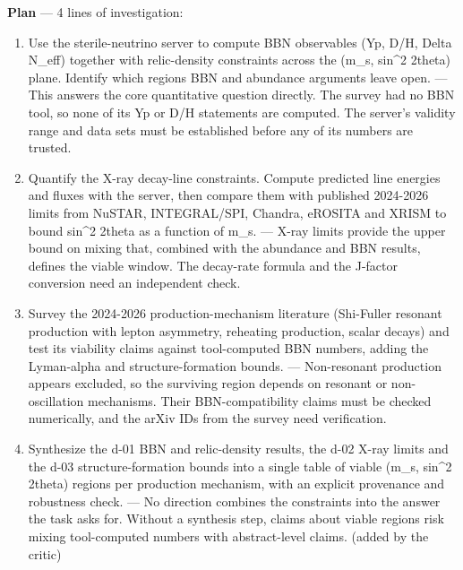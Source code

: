 \documentclass[11pt,a4paper]{article}
\begin{document}
\textbf{Plan} --- 4 lines of investigation:

\begin{enumerate}
  \item Use the sterile-neutrino server to compute BBN observables (Yp, D/H, Delta N\_eff) together with relic-density constraints across the (m\_s, sin\textasciicircum{}2 2theta) plane. Identify which regions BBN and abundance arguments leave open. --- This answers the core quantitative question directly. The survey had no BBN tool, so none of its Yp or D/H statements are computed. The server's validity range and data sets must be established before any of its numbers are trusted.
  \item Quantify the X-ray decay-line constraints. Compute predicted line energies and fluxes with the server, then compare them with published 2024-2026 limits from NuSTAR, INTEGRAL/SPI, Chandra, eROSITA and XRISM to bound sin\textasciicircum{}2 2theta as a function of m\_s. --- X-ray limits provide the upper bound on mixing that, combined with the abundance and BBN results, defines the viable window. The decay-rate formula and the J-factor conversion need an independent check.
  \item Survey the 2024-2026 production-mechanism literature (Shi-Fuller resonant production with lepton asymmetry, reheating production, scalar decays) and test its viability claims against tool-computed BBN numbers, adding the Lyman-alpha and structure-formation bounds. --- Non-resonant production appears excluded, so the surviving region depends on resonant or non-oscillation mechanisms. Their BBN-compatibility claims must be checked numerically, and the arXiv IDs from the survey need verification.
  \item Synthesize the d-01 BBN and relic-density results, the d-02 X-ray limits and the d-03 structure-formation bounds into a single table of viable (m\_s, sin\textasciicircum{}2 2theta) regions per production mechanism, with an explicit provenance and robustness check. --- No direction combines the constraints into the answer the task asks for. Without a synthesis step, claims about viable regions risk mixing tool-computed numbers with abstract-level claims. (added by the critic)

\end{enumerate}
\end{document}

